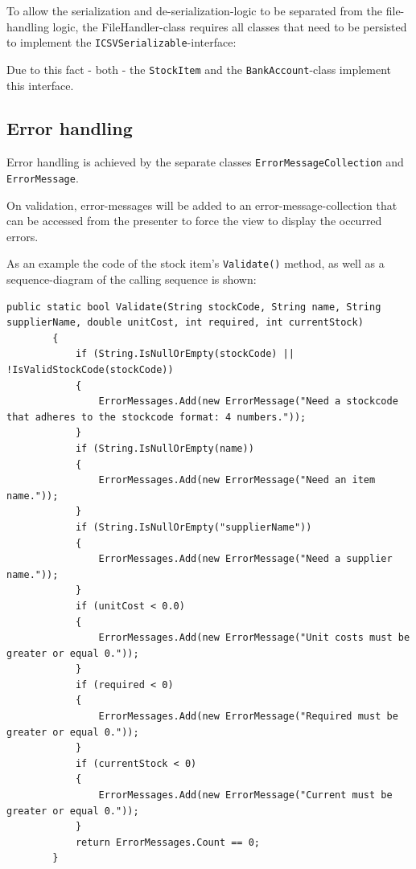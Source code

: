 To allow the serialization and de-serialization-logic to be separated from the file-handling logic, the FileHandler-class requires all classes that need to be persisted to implement the \texttt{ICSVSerializable}-interface:



Due to this fact - both - the \texttt{StockItem} and the \texttt{BankAccount}-class implement this interface.

\subsection{Error handling}
\label{subsec:error_handling}

Error handling is achieved by the separate classes \texttt{ErrorMessageCollection} and \texttt{ErrorMessage}.

On validation, error-messages will be added to an error-message-collection that can be accessed from the presenter to force the view to display the occurred errors.

As an example the code of the stock item's \texttt{Validate()} method, as well as a sequence-diagram of the calling sequence is shown:

\begin{lstlisting}[caption=Validate method of StockItem]
public static bool Validate(String stockCode, String name, String supplierName, double unitCost, int required, int currentStock)
        {
            if (String.IsNullOrEmpty(stockCode) || !IsValidStockCode(stockCode))
            {
                ErrorMessages.Add(new ErrorMessage("Need a stockcode that adheres to the stockcode format: 4 numbers."));
            }
            if (String.IsNullOrEmpty(name))
            {
                ErrorMessages.Add(new ErrorMessage("Need an item name."));
            }
            if (String.IsNullOrEmpty("supplierName"))
            {
                ErrorMessages.Add(new ErrorMessage("Need a supplier name."));
            }
            if (unitCost < 0.0)
            {
                ErrorMessages.Add(new ErrorMessage("Unit costs must be greater or equal 0."));
            }
            if (required < 0)
            {
                ErrorMessages.Add(new ErrorMessage("Required must be greater or equal 0."));
            }
            if (currentStock < 0)
            {
                ErrorMessages.Add(new ErrorMessage("Current must be greater or equal 0."));
            }
            return ErrorMessages.Count == 0;
        }
\end{lstlisting}

